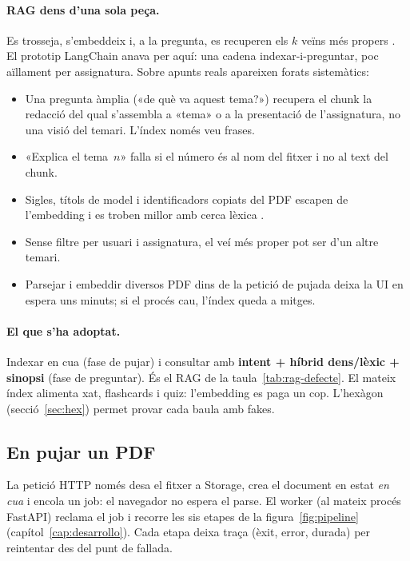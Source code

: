\paragraph{RAG dens d'una sola peça.}
Es trosseja, s'embeddeix i, a la pregunta, es recuperen els $k$ veïns més propers \parencite{lewis2020rag,karpukhin2020dpr}. El prototip LangChain anava per aquí: una cadena indexar-i-preguntar, poc aïllament per assignatura. Sobre apunts reals apareixen forats sistemàtics:

\begin{itemize}
  \item Una pregunta àmplia («de què va aquest tema?») recupera el chunk la redacció del qual s'assembla a «tema» o a la presentació de l'assignatura, no una visió del temari. L'índex només veu frases.
  \item «Explica el tema~$n$» falla si el número és al nom del fitxer i no al text del chunk.
  \item Sigles, títols de model i identificadors copiats del PDF escapen de l'embedding i es troben millor amb cerca lèxica \parencite{robertson2009probabilistic}.
  \item Sense filtre per usuari i assignatura, el veí més proper pot ser d'un altre temari.
  \item Parsejar i embeddir diversos PDF dins de la petició de pujada deixa la UI en espera uns minuts; si el procés cau, l'índex queda a mitges.
\end{itemize}

\paragraph{El que s'ha adoptat.}
Indexar en cua (fase de pujar) i consultar amb \textbf{intent + híbrid dens/lèxic + sinopsi} (fase de preguntar). És el RAG de la taula~\ref{tab:rag-defecte}. El mateix índex alimenta xat, flashcards i quiz: l'embedding es paga un cop. L'hexàgon (secció~\ref{sec:hex}) permet provar cada baula amb fakes.

\subsection{En pujar un PDF}
\label{sec:rag-ingest}

La petició HTTP només desa el fitxer a Storage, crea el document en estat \emph{en cua} i encola un job: el navegador no espera el parse. El worker (al mateix procés FastAPI) reclama el job i recorre les sis etapes de la figura~\ref{fig:pipeline} (capítol~\ref{cap:desarrollo}). Cada etapa deixa traça (èxit, error, durada) per reintentar des del punt de fallada.

